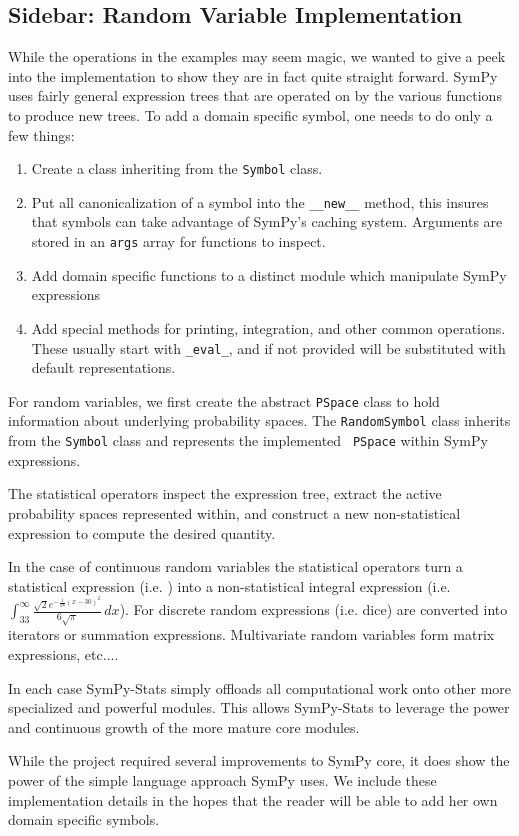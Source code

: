 \subsection{Sidebar: Random Variable Implementation}

While the operations in the examples may seem magic, we wanted to give a peek
into the implementation to show they are in fact quite straight forward. SymPy
uses fairly general expression trees that are operated on by the various
functions to produce new trees.  To add a domain specific symbol, one needs to
do only a few things:

\begin{enumerate}
\item Create a class inheriting from the {\tt Symbol} class. 
\item Put all canonicalization of a symbol into the {\tt \_\_new\_\_} method, this
  insures that symbols can take advantage of SymPy's caching system.  Arguments
  are stored in an {\tt args} array for functions to inspect.
\item Add domain specific functions to a distinct module which manipulate SymPy expressions
\item Add special methods for printing, integration, and other common
  operations.  These usually start with {\tt \_eval\_}, and if not provided will
  be substituted with default representations.
\end{enumerate}

For random variables, we first create the abstract {\tt PSpace} class to hold
information about underlying probability spaces.  The {\tt RandomSymbol}
class inherits from the {\tt Symbol} class and represents the implemented {\tt
  PSpace} within SymPy expressions.
 
The statistical operators  inspect the expression tree, extract the active probability spaces represented within, and construct a new non-statistical expression to compute the desired quantity. 

In the case of continuous random variables the statistical operators turn a statistical expression (i.e. ) into a non-statistical integral expression (i.e. $\int_{33}^{\infty} \frac{\sqrt{2} e^{- \frac{1}{18} \left(x -30\right)^{2}}}{6 \sqrt{\pi}}\, dx $). For discrete random expressions (i.e. dice) are converted into iterators or summation expressions. Multivariate random variables form matrix expressions, etc.... 

In each case SymPy-Stats simply offloads all computational work onto other more specialized and powerful modules. This allows SymPy-Stats to leverage the power and continuous growth of the more mature core modules.

While the project required several improvements to SymPy core, it does show the
power of the simple language approach SymPy uses.  We include these
implementation details in the hopes that the reader will be able to add her own
domain specific symbols.
